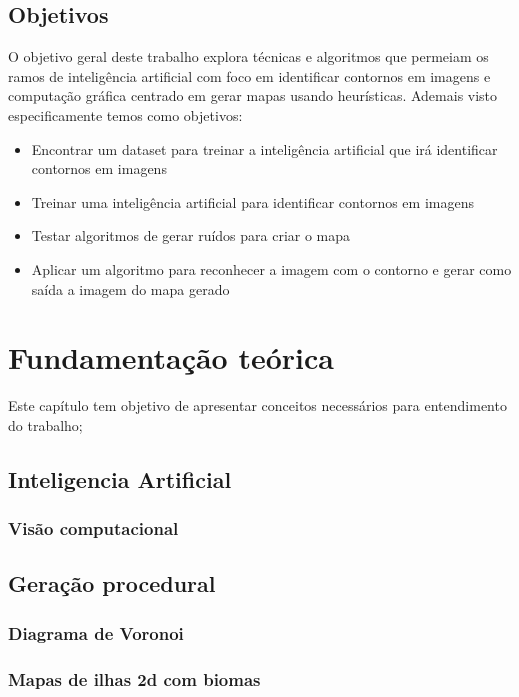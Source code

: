 \documentclass[12pt]{tcc}
\begin{document}
\section{Objetivos}

O objetivo geral deste trabalho explora técnicas e algoritmos que permeiam os ramos de inteligência artificial com foco em identificar contornos em imagens e computação gráfica centrado em gerar mapas usando heurísticas.
Ademais visto especificamente temos como objetivos:

\begin{itemize}
	\item Encontrar um dataset para treinar a inteligência artificial que irá identificar contornos em imagens
	\item Treinar uma inteligência artificial para identificar contornos em imagens
	\item Testar algoritmos de gerar ruídos para criar o mapa
	\item Aplicar um algoritmo para reconhecer a imagem com o contorno e gerar como saída a imagem do mapa gerado
\end{itemize}



\chapter{Fundamentação teórica}
\label{sec:background}
	\label{sec:fund_teorica}

Este capítulo tem objetivo de apresentar conceitos necessários para entendimento do trabalho;

\section{Inteligencia Artificial}

\subsection{Visão computacional}

\section{Geração procedural}

\subsection{Diagrama de Voronoi}

\subsection{Mapas de ilhas 2d com biomas}
\end{document}
